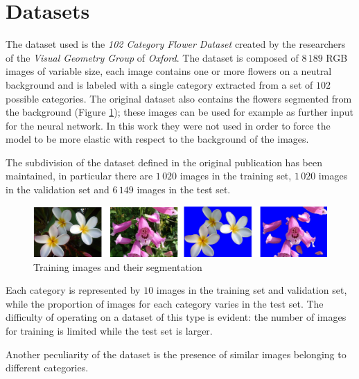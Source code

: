 \section{Datasets}
The dataset used is the \textit{102 Category Flower Dataset} \cite{Nilsback08} created by the researchers of the \textit{Visual Geometry Group} of \textit{Oxford}. The dataset is composed of $8\,189$ RGB images of variable size, each image contains one or more flowers on a neutral background and is labeled with a single category extracted from a set of $102$ possible categories. The original dataset also contains the flowers segmented from the background (Figure \ref{fig_dataset}); these images can be used for example as further input for the neural network. In this work they were not used in order to force the model to be more elastic with respect to the background of the images. \par
The subdivision of the dataset defined in the original publication has been maintained, in particular there are $1\,020$ images in the training set, $1\,020$ images in the validation set and $6\,149$ images in the test set.

\begin{figure}[ht!]
\centering  
\includegraphics[width=1.0\textwidth]{images/dataset.png} 
\caption{Training images and their segmentation}
\label{fig_dataset}
\end{figure}

Each category is represented by $10$ images in the training set and validation set, while the proportion of images for each category varies in the test set.
The difficulty of operating on a dataset of this type is evident: the number of images for training is limited while the test set is larger. \par
Another peculiarity of the dataset is the presence of similar images belonging to different categories.





















